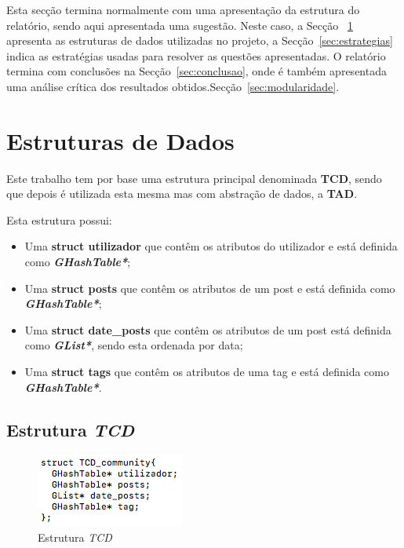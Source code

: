 \documentclass[a4paper]{article}
\begin{document}
Esta secção termina normalmente com uma apresentação da estrutura do
relatório, sendo aqui apresentada uma sugestão. Neste caso, a Secção
~\ref{sec:estruturas} apresenta as estruturas de dados utilizadas 
no projeto, a Secção~\ref{sec:estrategias} indica as estratégias usadas 
para resolver as  questões apresentadas. O relatório termina com conclusões na
Secção~\ref{sec:conclusao}, onde é também apresentada uma análise
crítica dos resultados obtidos.Secção~\ref{sec:modularidade}.

\section{Estruturas de Dados}
\label{sec:estruturas}

Este trabalho tem por base uma estrutura principal denominada \textbf{TCD}, 
sendo que depois é utilizada esta mesma mas com abstração de dados, a 
\textbf{TAD}.

Esta estrutura possui:
\begin{itemize}
	\item Uma \textbf{struct utilizador} que contêm os atributos do utilizador
e está definida como \textit{\textbf{GHashTable*}};
	\item Uma \textbf{struct posts} que contêm os atributos de um post e
está definida como \textit{\textbf{GHashTable*}};
	\item Uma \textbf{struct date\_posts} que contêm os atributos de um post
está definida como \textit{\textbf{GList*}}, sendo esta ordenada por data;
	\item Uma \textbf{struct tags} que contêm os atributos de uma tag e
está definida como \textit{\textbf{GHashTable*}}.
\end{itemize}

\subsection{Estrutura \textit{TCD}}
\begin{figure}[ht]
\centering
\includegraphics[scale=0.50]{image_tcd}
\caption{Estrutura \textit{TCD}}
\label{img:tcd}
\end{figure}
\end{document}

